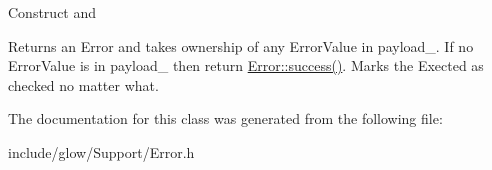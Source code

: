 Construct and \begin{DoxyReturn}{Returns}
an Error and takes ownership of any Error\+Value in payload\+\_\+. If no Error\+Value is in payload\+\_\+ then return \hyperlink{classglow_1_1detail_1_1_glow_error_ace73703b37f7e894290547c34927dba7}{Error\+::success()}. Marks the Exected as checked no matter what. 
\end{DoxyReturn}


The documentation for this class was generated from the following file\+:\begin{DoxyCompactItemize}
\item 
include/glow/\+Support/Error.\+h\end{DoxyCompactItemize}
